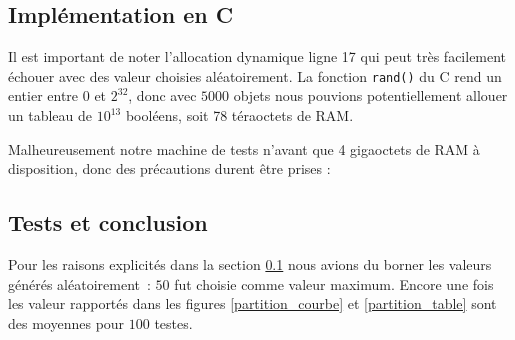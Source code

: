 \subsection{Implémentation en C}
\label{implementation_c}
Il est important de noter l'allocation dynamique ligne 17 qui peut très facilement échouer avec des valeur choisies aléatoirement. La fonction \texttt{rand()} du C rend un entier entre $0$ et $2^{32}$, donc avec $5000$ objets nous pouvions potentiellement allouer un tableau de $10^{13}$ booléens, soit 78 téraoctets de RAM.

Malheureusement notre machine de tests n'avant que 4 gigaoctets de RAM à disposition, donc des précautions durent être prises :

\vspace{0.5cm}

 

\subsection{Tests et conclusion}

Pour les raisons explicités dans la section \ref{implementation_c} nous avions du borner les valeurs générés aléatoirement~: $50$ fut choisie comme valeur maximum. Encore une fois les valeur rapportés dans les figures \ref{partition_courbe} et \ref{partition_table} sont des moyennes pour $100$ testes.

